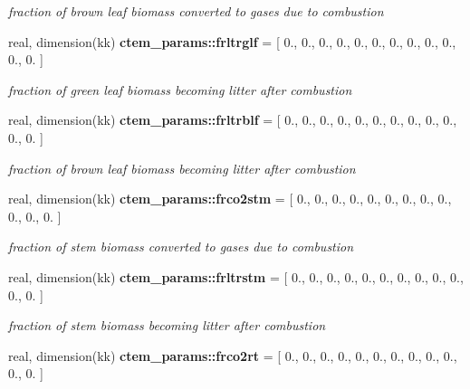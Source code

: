 \begin{DoxyCompactItemize}
\begin{DoxyCompactList}\small\item\em fraction of brown leaf biomass converted to gases due to combustion \end{DoxyCompactList}\item 
\hypertarget{namespacectem__params_ab9c6dc0514620728eecf50eb9c37892e}{}real, dimension(kk) {\bfseries ctem\+\_\+params\+::frltrglf} = \mbox{[} 0., 0., 0., 0., 0., 0., 0., 0., 0., 0., 0., 0. \mbox{]}\label{namespacectem__params_ab9c6dc0514620728eecf50eb9c37892e}

\begin{DoxyCompactList}\small\item\em fraction of green leaf biomass becoming litter after combustion \end{DoxyCompactList}\item 
\hypertarget{namespacectem__params_a665ceea7e9350e769153df8ce09859c9}{}real, dimension(kk) {\bfseries ctem\+\_\+params\+::frltrblf} = \mbox{[} 0., 0., 0., 0., 0., 0., 0., 0., 0., 0., 0., 0. \mbox{]}\label{namespacectem__params_a665ceea7e9350e769153df8ce09859c9}

\begin{DoxyCompactList}\small\item\em fraction of brown leaf biomass becoming litter after combustion \end{DoxyCompactList}\item 
\hypertarget{namespacectem__params_a16e61987713a7f1a1434ff33d5129cbe}{}real, dimension(kk) {\bfseries ctem\+\_\+params\+::frco2stm} = \mbox{[} 0., 0., 0., 0., 0., 0., 0., 0., 0., 0., 0., 0. \mbox{]}\label{namespacectem__params_a16e61987713a7f1a1434ff33d5129cbe}

\begin{DoxyCompactList}\small\item\em fraction of stem biomass converted to gases due to combustion \end{DoxyCompactList}\item 
\hypertarget{namespacectem__params_a9c2ccc3e7359b88d45fd61fdbf47900c}{}real, dimension(kk) {\bfseries ctem\+\_\+params\+::frltrstm} = \mbox{[} 0., 0., 0., 0., 0., 0., 0., 0., 0., 0., 0., 0. \mbox{]}\label{namespacectem__params_a9c2ccc3e7359b88d45fd61fdbf47900c}

\begin{DoxyCompactList}\small\item\em fraction of stem biomass becoming litter after combustion \end{DoxyCompactList}\item 
\hypertarget{namespacectem__params_ac11f9cbbf331e0bb6bbb5a675fdc4543}{}real, dimension(kk) {\bfseries ctem\+\_\+params\+::frco2rt} = \mbox{[} 0., 0., 0., 0., 0., 0., 0., 0., 0., 0., 0., 0. \mbox{]}\label{namespacectem__params_ac11f9cbbf331e0bb6bbb5a675fdc4543}


\end{DoxyCompactItemize}
